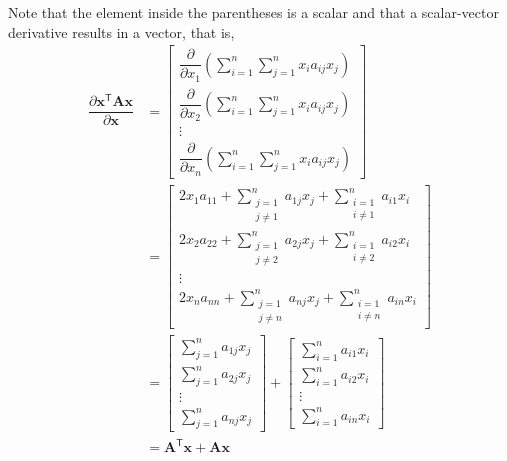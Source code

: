 \documentclass{article}
\newcommand{\trans}{\mathsf{T}}
\begin{document}
Note that the element inside the parentheses is a scalar and that a scalar-vector derivative results in a vector, that is,
\begin{align}
    \dfrac{\partial \mathbf{x}^\trans \mathbf{A} \mathbf{x}}{\partial \mathbf{x}} &= \begin{bmatrix}
        \displaystyle \dfrac{\partial}{\partial x_1} \left( \sum_{i = 1}^{n}\sum_{j = 1}^{n} x_{i} a_{ij} x_{j} \right) \\ 
        \displaystyle  \dfrac{\partial}{\partial x_2} \left( \sum_{i = 1}^{n}\sum_{j = 1}^{n} x_{i} a_{ij} x_{j} \right) \\ 
        \vdots \\ 
        \displaystyle \dfrac{\partial}{\partial x_n} \left( \sum_{i = 1}^{n}\sum_{j = 1}^{n} x_{i} a_{ij} x_{j} \right) 
    \end{bmatrix} \\
    & = \begin{bmatrix}
        \displaystyle 2x_1a_{11} + \sum_{\substack{j = 1 \\ j \neq 1}}^{n} a_{1j} x_{j} + \sum_{\substack{i = 1 \\ i \neq 1}}^{n} a_{i1} x_{i} \\
        \displaystyle 2x_2a_{22} + \sum_{\substack{j = 1 \\ j \neq 2}}^{n} a_{2j} x_{j} + \sum_{\substack{i = 1 \\ i \neq 2}}^{n} a_{i2} x_{i} \\
        \vdots \\
        \displaystyle 2x_na_{nn} + \sum_{\substack{j = 1 \\ j \neq n}}^{n} a_{nj} x_{j} + \sum_{\substack{i = 1 \\ i \neq n}}^{n} a_{in} x_{i} 
    \end{bmatrix} \\
    &= \begin{bmatrix}
        \displaystyle \sum_{j = 1}^{n} a_{1j} x_{j} \\
        \displaystyle \sum_{j = 1}^{n} a_{2j} x_{j} \\
        \vdots \\
        \displaystyle \sum_{j = 1}^{n} a_{nj} x_{j} 
    \end{bmatrix} +
    \begin{bmatrix}
        \displaystyle \sum_{i = 1}^{n} a_{i1} x_{i} \\
        \displaystyle \sum_{i = 1}^{n} a_{i2} x_{i} \\
        \vdots \\
        \displaystyle \sum_{i = 1}^{n} a_{in} x_{i} 
    \end{bmatrix} \\
    & = \mathbf{A}^\trans \mathbf{x} + \mathbf{A} \mathbf{x}
\end{align}
\end{document}
